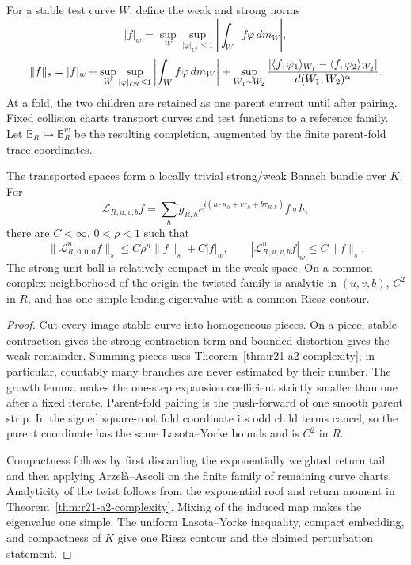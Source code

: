 For a stable test curve $W$, define the weak and strong norms
\[
 |f|_w=\sup_W\sup_{|\varphi|_{C^1}\le1}
          \left|\int_W f\varphi\,dm_W\right|,
\]
\[
 \|f\|_s=|f|_w+\sup_W\sup_{|\varphi|_{C^q}\le1}
          \left|\int_W f\varphi\,dm_W\right|
 +\sup_{W_1\sim W_2}{|\langle f,\varphi_1\rangle_{W_1}
 -\langle f,\varphi_2\rangle_{W_2}|\over d(W_1,W_2)^\alpha}.
\]
At a fold, the two children are retained as one parent current until after
pairing.  Fixed collision charts transport curves and test functions to a
reference family.  Let $\mathbb B_R\hookrightarrow\mathbb B_R^w$ be the
resulting completion, augmented by the finite parent-fold trace coordinates.

\begin{theorem}
\label{thm:r21-a2-bundle}
The transported spaces form a locally trivial strong/weak Banach bundle over
$K$.  For
\[
 \mathcal L_{R,u,v,b}f
 =\sum_h g_{R,h}
 e^{i(u\cdot\kappa_h+vr_h+b\tau_{R,h})}f\circ h,
\]
there are $C<\infty$, $0<\rho<1$ such that
\[
 \|\mathcal L_{R,0,0,0}^nf\|_s
 \le C\rho^n\|f\|_s+C|f|_w,
\qquad
 |\mathcal L_{R,u,v,b}^nf|_w\le C\|f\|_s .
\]
The strong unit ball is relatively compact in the weak space.  On a common
complex neighborhood of the origin the twisted family is analytic in
$(u,v,b)$, $C^2$ in $R$, and has one simple leading eigenvalue with a common
Riesz contour.
\end{theorem}

\begin{proof}
Cut every image stable curve into homogeneous pieces.  On a piece, stable
contraction gives the strong contraction term and bounded distortion gives
the weak remainder.  Summing pieces uses
Theorem~\ref{thm:r21-a2-complexity}; in particular, countably many branches
are never estimated by their number.  The growth lemma makes the one-step
expansion coefficient strictly smaller than one after a fixed iterate.
Parent-fold pairing is the push-forward of one smooth parent strip.  In the
signed square-root fold coordinate its odd child terms cancel, so the parent
coordinate has the same Lasota--Yorke bounds and is $C^2$ in $R$.

Compactness follows by first discarding the exponentially weighted return
tail and then applying Arzel\`a--Ascoli on the finite family of remaining
curve charts.  Analyticity of the twist follows from the exponential roof and
return moment in Theorem~\ref{thm:r21-a2-complexity}.  Mixing of the induced
map makes the eigenvalue one simple.  The uniform Lasota--Yorke inequality,
compact embedding, and compactness of $K$ give one Riesz contour and the
claimed perturbation statement.
\end{proof}

